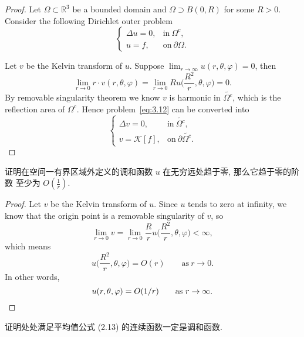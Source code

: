 \begin{proof}
  Let $\varOmega\subset\mathbb{R}^3$ be a bounded domain and
  $\varOmega\supset B(0,R)$ for some $R>0$.
  Consider the following Dirichlet outer problem
  \begin{equation}\label{eq:3.12}
    \begin{cases}
      \Delta u = 0, & \text{in}\ \varOmega^c, \\
      u = f, & \text{on}\ \partial\varOmega.
    \end{cases}
\end{equation}

  Let $v$ be the Kelvin transform of $u$.
  Suppose $\lim_{r\to\infty} u(r,\theta,\varphi)=0$, then
  \[ \lim_{r\to 0} r\cdot v(r,\theta,\varphi)
      = \lim_{r\to 0} R u\biggl(\frac{R^2}{r},\theta,\varphi\biggr) = 0. \]
  By removable singularity theorem we know $v$ is harmonic in $\widetilde{\varOmega^c}$,
  which is the reflection area of $\varOmega^c$. Hence problem~\eqref{eq:3.12}
  can be converted into
  \begin{equation}\label{eq:3.13}
    \begin{cases}
      \Delta v = 0, & \text{in}\ \widetilde{\varOmega^c}, \\
      v = \mathcal{K}[f], & \text{on}\ \partial\widetilde{\varOmega^c}.
    \end{cases}
  \end{equation}
\end{proof}


\begin{exercise}
  证明在空间一有界区域外定义的调和函数 $u$ 在无穷远处趋于零, 那么它趋于零的阶数
  至少为 $\displaystyle O\left(\frac{1}{r}\right)$.
\end{exercise}

\begin{proof}
  Let $v$ be the Kelvin transform of $u$.
  Since $u$ tends to zero at infinity, we know that the origin point is
  a removable singularity of $v$, so
  \[ \lim_{r\to 0} v = \lim_{r\to 0} \frac{R}{r} u\biggl(\frac{R^2}{r},\theta,\varphi\biggr) <\infty, \]
  which means
  \[ u\biggl(\frac{R^2}{r},\theta,\varphi\biggr) = O(r) \qquad \text{as}\ r\to 0. \]
  In other words,
  \[ u(r,\theta,\varphi) = O(1/r) \qquad \text{as}\ r\to\infty. \qedhere \]
\end{proof}

\begin{exercise}
  证明处处满足平均值公式 (2.13) 的连续函数一定是调和函数.
\end{exercise}

